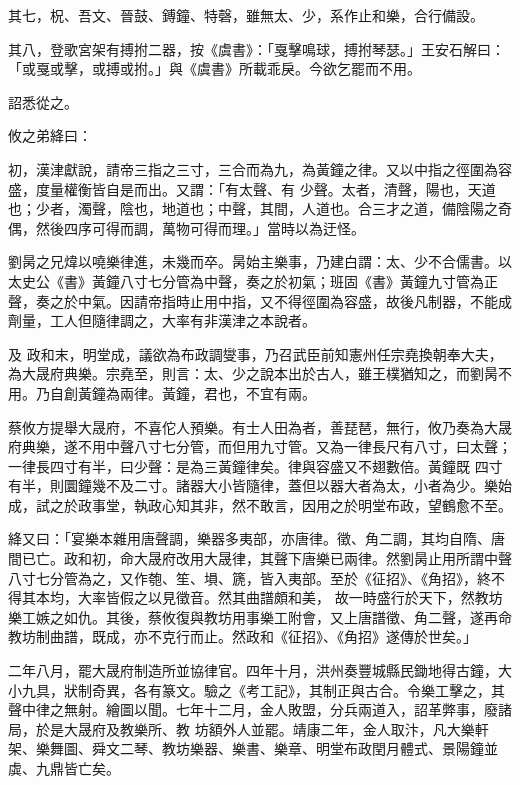 \begin{pinyinscope}
 其七，柷、吾文、晉鼓、鎛鐘、特磬，雖無太、少，系作止和樂，合行備設。



 其八，登歌宮架有搏拊二器，按《虞書》：「戛擊鳴球，搏拊琴瑟。」王安石解曰：「或戛或擊，或搏或拊。」與《虞書》所載乖戾。今欲乞罷而不用。



 詔悉從之。



 攸之弟絳曰：



 初，漢津獻說，請帝三指之三寸，三合而為九，為黃鐘之律。又以中指之徑圍為容盛，度量權衡皆自是而出。又謂：「有太聲、有
 少聲。太者，清聲，陽也，天道也；少者，濁聲，陰也，地道也；中聲，其間，人道也。合三才之道，備陰陽之奇偶，然後四序可得而調，萬物可得而理。」當時以為迂怪。



 劉昺之兄煒以嘵樂律進，未幾而卒。昺始主樂事，乃建白謂：太、少不合儒書。以太史公《書》黃鐘八寸七分管為中聲，奏之於初氣；班固《書》黃鐘九寸管為正聲，奏之於中氣。因請帝指時止用中指，又不得徑圍為容盛，故後凡制器，不能成劑量，工人但隨律調之，大率有非漢津之本說者。



 及
 政和末，明堂成，議欲為布政調燮事，乃召武臣前知憲州任宗堯換朝奉大夫，為大晟府典樂。宗堯至，則言：太、少之說本出於古人，雖王樸猶知之，而劉昺不用。乃自創黃鐘為兩律。黃鐘，君也，不宜有兩。



 蔡攸方提舉大晟府，不喜佗人預樂。有士人田為者，善琵琶，無行，攸乃奏為大晟府典樂，遂不用中聲八寸七分管，而但用九寸管。又為一律長尺有八寸，曰太聲；一律長四寸有半，曰少聲：是為三黃鐘律矣。律與容盛又不翅數倍。黃鐘既
 四寸有半，則圜鐘幾不及二寸。諸器大小皆隨律，蓋但以器大者為太，小者為少。樂始成，試之於政事堂，執政心知其非，然不敢言，因用之於明堂布政，望鶴愈不至。



 絳又曰：「宴樂本雜用唐聲調，樂器多夷部，亦唐律。徵、角二調，其均自隋、唐間已亡。政和初，命大晟府改用大晟律，其聲下唐樂已兩律。然劉昺止用所謂中聲八寸七分管為之，又作匏、笙、塤、篪，皆入夷部。至於《征招》、《角招》，終不得其本均，大率皆假之以見徵音。然其曲譜頗和美，
 故一時盛行於天下，然教坊樂工嫉之如仇。其後，蔡攸復與教坊用事樂工附會，又上唐譜徵、角二聲，遂再命教坊制曲譜，既成，亦不克行而止。然政和《征招》、《角招》遂傳於世矣。」



 二年八月，罷大晟府制造所並協律官。四年十月，洪州奏豐城縣民鋤地得古鐘，大小九具，狀制奇異，各有篆文。驗之《考工記》，其制正與古合。令樂工擊之，其聲中律之無射。繪圖以聞。七年十二月，金人敗盟，分兵兩道入，詔革弊事，廢諸局，於是大晟府及教樂所、教
 坊額外人並罷。靖康二年，金人取汴，凡大樂軒架、樂舞圖、舜文二琴、教坊樂器、樂書、樂章、明堂布政閏月體式、景陽鐘並虡、九鼎皆亡矣。



\end{pinyinscope}